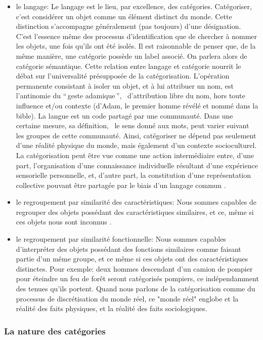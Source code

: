{\begin{itemize}
\item le langage: Le langage est le lieu, par excellence, des catégories. Catégoriser, c'est considérer un objet comme un élément distinct du monde. Cette distinction s'accompagne généralement (pas toujours) d'une désignation. C'est l'essence même des processus d'identification que de chercher à nommer les objets, une fois qu'ils ont été isolés. Il est raisonnable de penser que, de la même manière, une catégorie possède un label associé. On parlera alors de catégorie sémantique. Cette relation entre langage et catégorie nourrit le débat sur l'universalité présupposée de la catégorisation. L'opération permanente consistant à isoler un objet, et à lui attribuer un nom, est l'antinomie du ``\,geste adamique\,'', \ie~d'attribution libre du nom, hors toute influence et/ou contexte (d'Adam, le premier homme révélé et nommé dans la bible). La langue est un code partagé par une communauté. Dans une certaine mesure, sa définition, \ie~le sens donné aux mots, peut varier suivant les groupes de cette communauté. Ainsi, catégoriser ne dépend pas seulement d'une réalité physique du monde, mais également d'un contexte socioculturel. La catégorisation peut être vue comme une action intermédiaire entre, d'une part, l'organisation d'une connaissance individuelle résultant d'une expérience sensorielle personnelle, et, d'autre part, la constitution d'une représentation collective pouvant être partagée par le biais d'un langage commun \citep{dubois2006cognitive}.
\item le regroupement par similarité des caractéristiques: Nous sommes capables de regrouper des objets possédant des caractéristiques similaires, et ce, même si ces objets nous sont inconnus \citep{fried1984induction}.
\item le regroupement par similarité fonctionnelle: Nous sommes capables d'interpréter des objets possédant des fonctions similaires comme faisant partie d'un même groupe, et ce même si ces objets ont des caractéristiques distinctes. Pour exemple: deux hommes descendant d'un camion de pompier pour éteindre un feu de forêt seront catégorisés pompiers, ce indépendamment des tenues qu'ils portent. Quand nous parlons de la catégorisation comme du processus de discrétisation du monde réel, ce "monde réel" englobe et la réalité des faits physiques, et la réalité des faits sociologiques.
\end{itemize}

\subsubsection{La nature des catégories}

}

